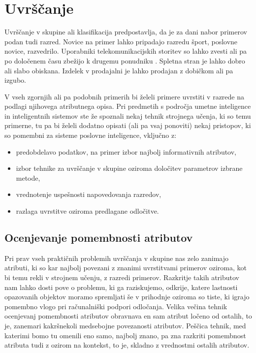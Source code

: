 \chapter{Uvrščanje}

Uvrščanje v skupine ali klasifikacija predpostavlja, da je za dani nabor primerov podan tudi razred. Novice na primer lahko pripadajo razredu šport, poslovne novice, razvedrilo. Uporabniki telekomunikacijskih storitev so lahko zvesti ali pa po določenem času zbežijo k drugemu ponudniku . Spletna stran je lahko dobro ali slabo obiskana. Izdelek v prodajalni je lahko prodajan z dobičkom ali pa izgubo.

V vseh zgornjih ali pa podobnih primerih bi želeli primere uvrstiti v razrede na podlagi njihovega atributnega opisa. Pri predmetih s področja umetne inteligence in inteligentnih sistemov ste že spoznali nekaj tehnik strojnega učenja, ki so temu primerne, tu pa bi želeli dodatno opisati (ali pa vsaj ponoviti) nekaj pristopov, ki so pomembni za sisteme poslovne inteligence, vključno z:

\begin{itemize}
\item predobdelavo podatkov, na primer izbor najbolj informativnih atributov,
\item izbor tehnike za uvrščanje v skupine oziroma določitev parametrov izbrane metode,
\item vrednotenje uspešnosti napovedovanja razredov,
\item razlaga uvrstitve oziroma predlagane odločitve.
\end{itemize}

\section{Ocenjevanje pomembnosti atributov\label{c-attribute-scoring}}

Pri prav vseh praktičnih problemih uvrščanja v skupine nas zelo zanimajo atributi, ki so kar najbolj povezani z znanimi uvrstitvami primerov oziroma, kot bi temu rekli v strojnem učenju, z razredi primerov. Razkritje takih atributov nam lahko dosti pove o problemu, ki ga raziskujemo, odkrije, katere lastnosti opazovanih objektov moramo spremljati še v prihodnje oziroma so tiste, ki igrajo pomembno vlogo pri računalniški podpori odločanja. Velika večina tehnik ocenjevanj pomembnosti atributov obravnava en sam atribut ločeno od ostalih, to je, zanemari kakršnekoli medsebojne povezanosti atributov. Peščica tehnik, med katerimi bomo tu omenili eno samo, najbolj znano, pa zna razkriti pomembnost atributa tudi z ozirom na kontekst, to je, skladno z vrednostmi ostalih atributov.

